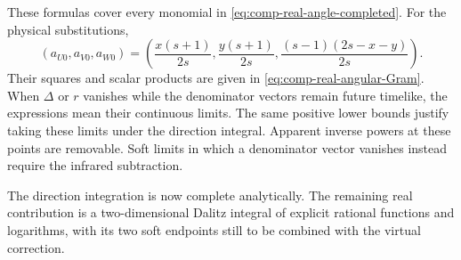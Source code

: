 These formulas cover every monomial in
\eqref{eq:comp-real-angle-completed}. For the physical substitutions,
\begin{equation}
 (a_{U0},a_{V0},a_{W0})
 =\left(\frac{x(s+1)}{2s},\frac{y(s+1)}{2s},
                    \frac{(s-1)(2s-x-y)}{2s}\right).
\end{equation}
Their squares and scalar products are given in
\eqref{eq:comp-real-angular-Gram}.
When $\Delta$ or $r$ vanishes while the denominator vectors remain
future timelike, the expressions mean their continuous limits.
The same positive lower bounds justify taking these limits under
the direction integral. Apparent inverse powers at these points
are removable. Soft limits in which a denominator vector vanishes
instead require the infrared subtraction.

The direction integration is now complete analytically. The
remaining real contribution is a two-dimensional Dalitz integral
of explicit rational functions and logarithms, with its two soft
endpoints still to be combined with the virtual correction.

